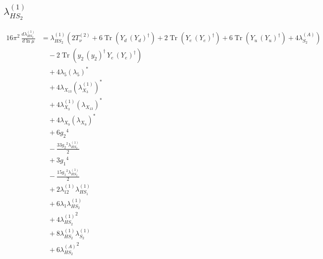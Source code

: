 \documentclass[10pt,a4paper]{article}
\begin{document}
\subsection*{$\lambda_{HS_2}^{(1)}$}
\begin{align*}
16\pi^2\,\frac{d \lambda_{HS_2}^{(1)}}{d\ln\mu} &={\lambda_{HS_2}^{(1)}} (2 T_{\nu}^{(2)}+6 \operatorname{Tr}\!\left({Y_d}\,\left({Y_d}\right)^{\dagger}\right)+2 \operatorname{Tr}\!\left({Y_e}\,\left({Y_e}\right)^{\dagger}\right)+6 \operatorname{Tr}\!\left({Y_u}\,\left({Y_u}\right)^{\dagger}\right)+4 {\lambda_{S_2}^{(A)}}) \\
&\quad -2 \operatorname{Tr}\!\left({y_2}\,\left({y_2}\right)^{\dagger}\,{Y_e}\,\left({Y_e}\right)^{\dagger}\right) \\
&\quad +4 {\lambda_5} \left({\lambda_5}\right)^{*} \\
&\quad +4 {\lambda_{X_{13}}} \left({\lambda_{X_{3}}^{(1)}}\right)^{*} \\
&\quad +4 {\lambda_{X_{3}}^{(1)}} \left({\lambda_{X_{13}}}\right)^{*} \\
&\quad +4 {\lambda_{X_{9}}} \left({\lambda_{X_{9}}}\right)^{*} \\
&\quad +6 {g_2}^4 \\
&\quad -\frac{33 {g_2}^2 {\lambda_{HS_2}^{(1)}}}{2} \\
&\quad +3 {g_1}^4 \\
&\quad -\frac{15 {g_1}^2 {\lambda_{HS_2}^{(1)}}}{2} \\
&\quad +2 {\lambda_{12}^{(1)}} {\lambda_{HS_1}^{(1)}} \\
&\quad +6 {\lambda_1} {\lambda_{HS_2}^{(1)}} \\
&\quad +4 {\lambda_{HS_2}^{(1)}}^2 \\
&\quad +8 {\lambda_{HS_2}^{(1)}} {\lambda_{S_2}^{(1)}} \\
&\quad +6 {\lambda_{HS_2}^{(A)}}^2 \\
\end{align*}
\end{document}
